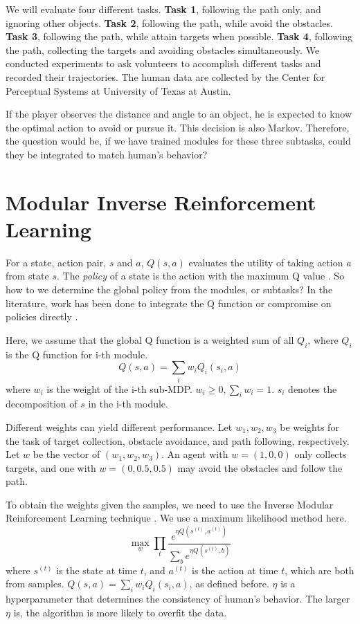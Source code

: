 \documentclass[11pt]{article} %
\begin{document}
We will evaluate four different tasks. {\bf Task 1}, following the path only, and
ignoring other objects. {\bf Task 2}, following the path, while avoid the obstacles.
{\bf Task 3}, following the path, while attain targets when possible. {\bf Task 4},
following the path, collecting the targets and avoiding obstacles
simultaneously.
We conducted experiments to ask volunteers to accomplish different tasks and
recorded their trajectories. The human data are collected by the Center for
Perceptual Systems at University of Texas at Austin.

If the player observes the distance and angle to an object, he is expected to
know the optimal action to avoid or pursue it. This decision is also Markov.
Therefore, the question would be, if we have trained modules for these three
subtasks, could they be integrated to match human's behavior?

\section{Modular Inverse Reinforcement Learning}
\label{sec:rl}

For a state, action
pair, $s$ and $a$, $Q(s, a)$ evaluates the utility of taking action $a$ from
state $s$. The {\em policy} of a state is the action with the maximum Q
value \cite{rl}. So how to we determine the global policy from the modules, or
subtasks? In the literature, work has been done to integrate the Q function
\cite{koller1999computing} or compromise on policies directly
\cite{thomas2012motor}.

Here, we assume that the global Q function is a weighted sum of all $Q_i$, where
$Q_i$ is the Q function for i-th module.
$$Q(s, a) = \sum_i w_i Q_i (s_i, a)$$
where $w_i$ is the weight of the i-th sub-MDP. $w_i \geq 0, \sum_i w_i = 1$.
$s_i$ denotes the decomposition of $s$ in the i-th module.

Different weights can yield different performance. Let $w_1, w_2, w_3$ be
weights for the task of target collection, obstacle avoidance, and path
following, respectively. Let $w$ be the vector of $(w_1, w_2, w_3)$. An agent
with $w = (1, 0, 0)$ only collects targets, and one with $w = (0, 0.5, 0.5)$ may
avoid the obstacles and follow the path.

To obtain the weights given the samples, we need to use the Inverse Modular
Reinforcement Learning technique \cite{rothkopf2013modular}. We use a maximum
likelihood method here.
\begin{equation}
\label{eq:irl}
\max_w \prod_t \frac{e^{\eta Q(s^{(t)}, a^{(t)})}}{\sum_b e^{\eta Q(s^{(t)}, b)}}
\end{equation}
where $s^{(t)}$ is the state at time $t$, and $a^{(t)}$ is the action at time
$t$, which are both from samples. $Q(s, a) = \sum_i w_i Q_i(s_i, a)$, as defined
before. $\eta$ is a hyperparameter that determines the consistency of human's
behavior. The larger $\eta$ is, the algorithm is more likely to overfit the data.
\end{document}
